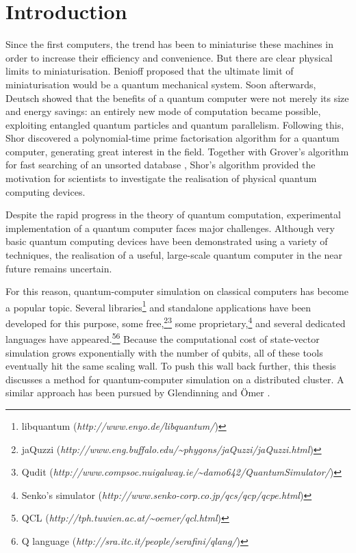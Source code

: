 \setcounter{equation}{0}
\section{Introduction}


Since the first computers, the trend has been to miniaturise these machines in order to increase their efficiency and convenience. But there are clear physical limits to miniaturisation. Benioff \cite{cps80} proposed that the ultimate limit of miniaturisation would be a quantum mechanical system. Soon afterwards, Deutsch \cite{qtct85} showed that the benefits of a quantum computer were not merely its size and energy savings: an entirely new mode of computation became possible, exploiting entangled quantum particles and quantum parallelism. Following this, Shor \cite{ptafpf94} discovered a polynomial-time prime factorisation algorithm for a quantum computer, generating great interest in the field. Together with Grover's algorithm for fast searching of an unsorted database \cite{fqma96}, Shor's algorithm provided the motivation for scientists to investigate the realisation of physical quantum computing devices.

Despite the rapid progress in the theory of quantum computation, experimental implementation of a quantum computer faces major challenges. Although very basic quantum computing devices have been demonstrated using a variety of techniques, the realisation of a useful, large-scale quantum computer in the near future remains uncertain.

For this reason, quantum-computer simulation on classical computers has become a popular topic. Several libraries\footnote{libquantum (\emph{http://www.enyo.de/libquantum/})} and standalone applications have been developed for this purpose, some free,\footnote{jaQuzzi (\emph{http://www.eng.buffalo.edu/\~{}phygons/jaQuzzi/jaQuzzi.html})}\footnote{Qudit (\emph{http://www.compsoc.nuigalway.ie/\~{}damo642/QuantumSimulator/})} some proprietary,\footnote{Senko's simulator (\emph{http://www.senko-corp.co.jp/qcs/qcp/qcpe.html})} and several dedicated languages have appeared.\footnote{QCL (\emph{http://tph.tuwien.ac.at/\~{}oemer/qcl.html})}\footnote{Q language (\emph{http://sra.itc.it/people/serafini/qlang/})} Because the computational cost of state-vector simulation grows exponentially with the number of qubits, all of these tools eventually hit the same scaling wall. To push this wall back further, this thesis discusses a method for quantum-computer simulation on a distributed cluster. A similar approach has been pursued by Glendinning and \"Omer \cite{pgsq03}.
